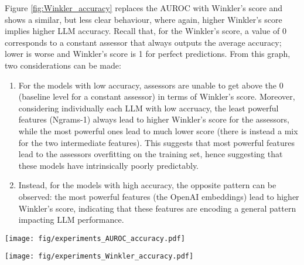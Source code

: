 \documentclass[11pt]{article}
\begin{document}
Figure \ref{fig:Winkler_accuracy} replaces the AUROC with Winkler's score and shows a similar, but less clear behaviour, where again, higher Winkler's score implies higher LLM accuracy. Recall that, for the Winkler's score, a value of 0 corresponds to a constant assessor that always outputs the average accuracy; lower is worse and Winkler's score is 1 for perfect predictions. From this graph, two considerations can be made: 
\begin{enumerate}
    \item For the models with low accuracy, assessors are unable to get above the 0 (baseline level for a constant assessor) in terms of Winkler's score. Moreover, considering individually each LLM with low accruacy, the least powerful features (Ngrams-1) always lead to higher Winkler's score for the assessors, while the most powerful ones lead to much lower score (there is instead a mix for the two intermediate features). This suggests that most powerful features lead to the assessors overfitting on the training set, hence suggesting that these models have intrinsically poorly predictably.
    \item Instead, for the models with high accuracy, the opposite pattern can be observed: the most powerful features (the OpenAI embeddings) lead to higher Winkler's score, indicating that these features are encoding a general pattern impacting LLM performance.
\end{enumerate}




\begin{figure*}[tb]
    \centering
    \texttt{[image: fig/experiments\_AUROC\_accuracy.pdf]}
    \caption{Relation between AUROC per assessor and accuracy per model on the test split of the MMLU-Pro dataset, for assessoras trained on the train split.}
    \label{fig:AUROC_accuracy}
\end{figure*}



\begin{figure*}[tb]
    \centering
    \texttt{[image: fig/experiments\_Winkler\_accuracy.pdf]}
    \caption{Relation between Winkler's score per assessor and accuracy per model on the test split of the MMLU-Pro dataset, for assessoras trained on the train split.}
    \label{fig:Winkler_accuracy}
\end{figure*}
\end{document}
